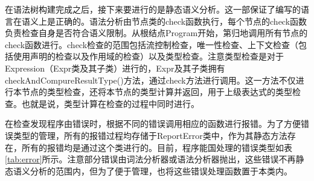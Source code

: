 \par 在语法树构建完成之后，接下来要进行的是静态语义分析。这一部保证了编写的语言在语义上是正确的。语法分析由节点类的check函数执行，每个节点的check函数负责检查自身是否符合语义限制。从根结点Program开始，第归地调用所有节点的check函数进行。check检查的范围包括流控制检查，唯一性检查、上下文检查（包括使用声明的检查以及作用域的检查）以及类型检查。注意类型检查是对于Expression（Expr类及其子类）进行的，Expr及其子类拥有checkAndCompureResultType()方法，通过check方法进行调用。这一方法不仅进行本节点的类型检查，还将本节点的类型计算并返回，用于上级表达式的类型检查。也就是说，类型计算在检查的过程中同时进行。

\par 在检查发现程序由错误时，根据不同的错误调用相应的函数进行报错。为了方便错误类型的管理，所有的报错过程均存储于ReportError类中，作为其静态方法存在，所有的报错均是通过这个类进行的。目前，程序能国处理的错误类型如表\ref{tab:error}所示。注意部分错误由词法分析器或语法分析器抛出，这些错误不再静态语义分析的范围内，但为了便于管理，也将这些错误处理函数置于本类内。

